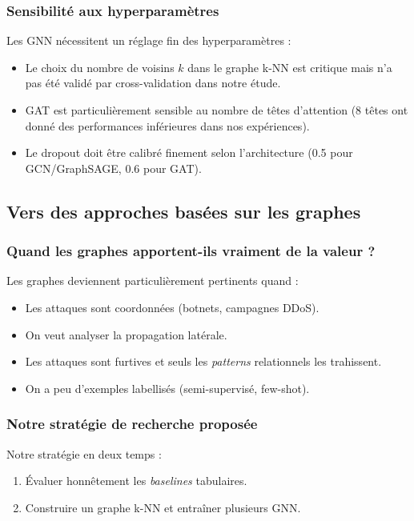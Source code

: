 ﻿\documentclass[11pt,a4paper]{article}
\begin{document}
\subsubsection{Sensibilité aux hyperparamètres}

Les GNN nécessitent un réglage fin des hyperparamètres :
    \begin{itemize}
    \item Le choix du nombre de voisins $k$ dans le graphe k-NN est critique mais n'a pas été validé par cross-validation dans notre étude.
    \item GAT est particulièrement sensible au nombre de têtes d'attention (8 têtes ont donné des performances inférieures dans nos expériences).
    \item Le dropout doit être calibré finement selon l'architecture (0.5 pour GCN/GraphSAGE, 0.6 pour GAT).
\end{itemize}

\subsection{Vers des approches basées sur les graphes}

\subsubsection{Quand les graphes apportent-ils vraiment de la valeur ?}

Les graphes deviennent particulièrement pertinents quand :
\begin{itemize}
    \item Les attaques sont coordonnées (botnets, campagnes DDoS).
    \item On veut analyser la propagation latérale.
    \item Les attaques sont furtives et seuls les \emph{patterns} relationnels les trahissent.
    \item On a peu d'exemples labellisés (semi-supervisé, few-shot).
\end{itemize}

\subsubsection{Notre stratégie de recherche proposée}

Notre stratégie en deux temps :
\begin{enumerate}
    \item Évaluer honnêtement les \emph{baselines} tabulaires.
    \item Construire un graphe k-NN et entraîner plusieurs GNN.
\end{enumerate}
\end{document}
